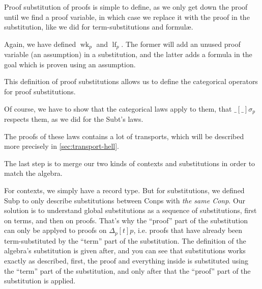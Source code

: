 \documentclass[10pt,a4paper]{article}
\begin{document}
			Proof substitution of proofs is simple to define, as we only get down the proof until we find a proof variable, in which case we replace it with the proof in the substitution, like we did for term-substitutions and formulæ.
			
			Again, we have defined $\operatorname{wk}_p$ and $\operatorname{lf}_p$. The former will add an unused proof variable (an assumption) in a substitution, and the latter adds a formula in the goal which is proven using an assumption.
		
			\begin{tcolorbox}
				\vspace{-2ex}
				\vspace{-7.5ex}
			\end{tcolorbox}
		
			This definition of proof substitutions allows us to define the categorical operators for proof substitutions. 
		
			Of course, we have to show that the categorical laws apply to them, that $\_[\_]\sigma_p$ respects them, as we did for the Subt's laws.
			
			The proofs of these laws contains a lot of transports, which will be described more precisely in \autoref{sec:transport-hell}.
			
			\begin{tcolorbox}
				\vspace{-2ex}
				\agda{agda/IIdCompP.tex}
				\vspace{-7.5ex}
			\end{tcolorbox}
		
			The last step is to merge our two kinds of contexts and substitutions in order to match the algebra.
			
			For contexts, we simply have a record type. But for substitutions, we defined Subp to only describe substitutions between Conp{\footnotesize s} with \emph{the same Conp}. Our solution is to understand global substitutions as a sequence of substitutions, first on terms, and then on proofs. That's why the \enquote{proof} part of the substitution can only be applyed to proofs on $\Delta_p [t]p$, i.e. proofs that have already been term-substituted by the \enquote{term} part of the substitution. The definition of the algebra's substitution is given after, and you can see that substitutions works exactly as described, first, the proof and everything inside is substituted using the \enquote{term} part of the substitution, and only after that the \enquote{proof} part of the substitution is applied.
		
\end{document}

